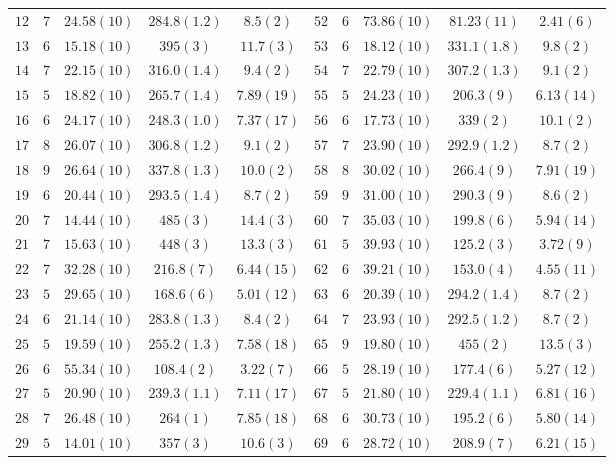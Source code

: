 \documentclass{../concepts/titul_zprava_p/prepareprotokolZprava} %
\begin{document}
\begin{table}[!htbp]
\begin{tabular}{ccccc|ccccc}
 $12$ & $7$ & $24.58(10)$ & $284.8(1.2)$ & $8.5(2)$ & $52$ & $6$ & $73.86(10)$ & $81.23(11)$ & $2.41(6)$ \\
 $13$ & $6$ & $15.18(10)$ & $395(3)$ & $11.7(3)$ & $53$ & $6$ & $18.12(10)$ & $331.1(1.8)$ & $9.8(2)$ \\
 $14$ & $7$ & $22.15(10)$ & $316.0(1.4)$ & $9.4(2)$ & $54$ & $7$ & $22.79(10)$ & $307.2(1.3)$ & $9.1(2)$ \\
 $15$ & $5$ & $18.82(10)$ & $265.7(1.4)$ & $7.89(19)$ & $55$ & $5$ & $24.23(10)$ & $206.3(9)$ & $6.13(14)$ \\
 $16$ & $6$ & $24.17(10)$ & $248.3(1.0)$ & $7.37(17)$ & $56$ & $6$ & $17.73(10)$ & $339(2)$ & $10.1(2)$ \\
 $17$ & $8$ & $26.07(10)$ & $306.8(1.2)$ & $9.1(2)$ & $57$ & $7$ & $23.90(10)$ & $292.9(1.2)$ & $8.7(2)$ \\
 $18$ & $9$ & $26.64(10)$ & $337.8(1.3)$ & $10.0(2)$ & $58$ & $8$ & $30.02(10)$ & $266.4(9)$ & $7.91(19)$ \\
 $19$ & $6$ & $20.44(10)$ & $293.5(1.4)$ & $8.7(2)$ & $59$ & $9$ & $31.00(10)$ & $290.3(9)$ & $8.6(2)$ \\
 $20$ & $7$ & $14.44(10)$ & $485(3)$ & $14.4(3)$ & $60$ & $7$ & $35.03(10)$ & $199.8(6)$ & $5.94(14)$ \\
 $21$ & $7$ & $15.63(10)$ & $448(3)$ & $13.3(3)$ & $61$ & $5$ & $39.93(10)$ & $125.2(3)$ & $3.72(9)$ \\
 $22$ & $7$ & $32.28(10)$ & $216.8(7)$ & $6.44(15)$ & $62$ & $6$ & $39.21(10)$ & $153.0(4)$ & $4.55(11)$ \\
 $23$ & $5$ & $29.65(10)$ & $168.6(6)$ & $5.01(12)$ & $63$ & $6$ & $20.39(10)$ & $294.2(1.4)$ & $8.7(2)$ \\
 $24$ & $6$ & $21.14(10)$ & $283.8(1.3)$ & $8.4(2)$ & $64$ & $7$ & $23.93(10)$ & $292.5(1.2)$ & $8.7(2)$ \\
 $25$ & $5$ & $19.59(10)$ & $255.2(1.3)$ & $7.58(18)$ & $65$ & $9$ & $19.80(10)$ & $455(2)$ & $13.5(3)$ \\
 $26$ & $6$ & $55.34(10)$ & $108.4(2)$ & $3.22(7)$ & $66$ & $5$ & $28.19(10)$ & $177.4(6)$ & $5.27(12)$ \\
 $27$ & $5$ & $20.90(10)$ & $239.3(1.1)$ & $7.11(17)$ & $67$ & $5$ & $21.80(10)$ & $229.4(1.1)$ & $6.81(16)$ \\
 $28$ & $7$ & $26.48(10)$ & $264(1)$ & $7.85(18)$ & $68$ & $6$ & $30.73(10)$ & $195.2(6)$ & $5.80(14)$ \\
 $29$ & $5$ & $14.01(10)$ & $357(3)$ & $10.6(3)$ & $69$ & $6$ & $28.72(10)$ & $208.9(7)$ & $6.21(15)$ \\

\end{tabular}
\end{table}
\end{document}
